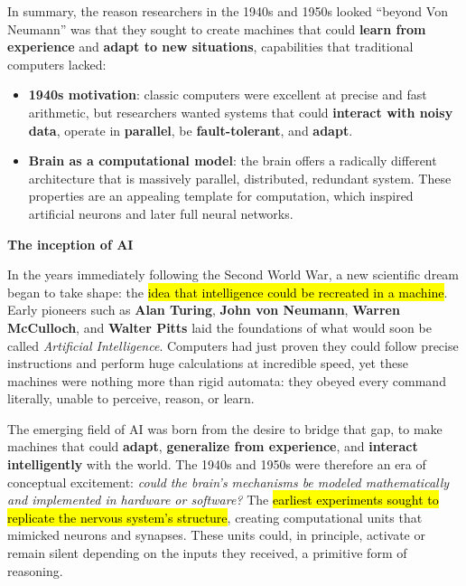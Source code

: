 \highspace
In summary, the reason researchers in the 1940s and 1950s looked ``beyond Von Neumann'' was that they sought to create machines that could \textbf{learn from experience} and \textbf{adapt to new situations}, capabilities that traditional computers lacked:
\begin{itemize}
    \item \textbf{1940s motivation}: classic computers were excellent at precise and fast arithmetic, but researchers wanted systems that could \textbf{interact with noisy data}, operate in \textbf{parallel}, be \textbf{fault-tolerant}, and \textbf{adapt}.
    \item \textbf{Brain as a computational model}: the brain offers a radically different architecture that is massively parallel, distributed, redundant system. These properties are an appealing template for computation, which inspired artificial neurons and later full neural networks.
\end{itemize}

\highspace
\begin{flushleft}
    \textcolor{Green3}{ \textbf{The inception of AI}}
\end{flushleft}
In the years immediately following the Second World War, a new scientific dream began to take shape: the \hl{idea that intelligence could be recreated in a machine}. Early pioneers such as \textbf{Alan Turing}, \textbf{John von Neumann}, \textbf{Warren McCulloch}, and \textbf{Walter Pitts} laid the foundations of what would soon be called \emph{Artificial Intelligence}. Computers had just proven they could follow precise instructions and perform huge calculations at incredible speed, yet these machines were nothing more than rigid automata: they obeyed every command literally, unable to perceive, reason, or learn.

\highspace
The emerging field of AI was born from the desire to bridge that gap, to make machines that could \textbf{adapt}, \textbf{generalize from experience}, and \textbf{interact intelligently} with the world. The 1940s and 1950s were therefore an era of conceptual excitement: \emph{could the brain's mechanisms be modeled mathematically and implemented in hardware or software?} The \hl{earliest experiments sought to replicate the nervous system's structure}, creating computational units that mimicked neurons and synapses. These units could, in principle, activate or remain silent depending on the inputs they received, a primitive form of reasoning.

